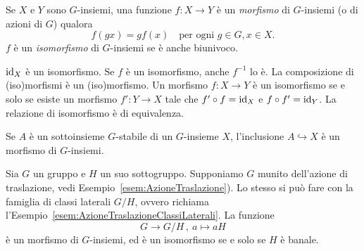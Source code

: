 



\begin{defi}
Se $X$ e $Y$ sono $G$-insiemi, una funzione $f : X\to Y$ è un {\em morfismo} di $G$-insiemi (o di azioni di $G$) qualora 
\[ f(gx) = gf(x) \quad\text{per ogni } g \in G, x \in X .\]
$f$ è un {\em isomorfismo} di $G$-insiemi se è anche biunivoco.
\end{defi}

\begin{osse}
$\mathrm{id}_X$ è un isomorfismo. Se $f$ è un isomorfismo, anche $f^{-1}$ lo è. La composizione di (iso)morfismi è un (iso)morfismo. Un morfismo $f : X\to Y$ è un isomorfismo se e solo se esiste un morfismo $f' : Y \to X$ tale che $f' \circ f = \mathrm{id}_X$ e $f \circ f' = \mathrm{id}_Y$. La relazione di isomorfismo è di equivalenza.
\end{osse}

\begin{esem}
Se $A$ è un sottoinsieme $G$-stabile di un $G$-insieme $X$, l'inclusione $A \hookrightarrow X$ è un morfismo di $G$-insiemi.
\end{esem}

\begin{esem}
Sia $G$ un gruppo e $H$ un suo sottogruppo. Supponiamo $G$ munito dell'azione di traslazione, vedi Esempio~\ref{esem:AzioneTraslazione}). Lo stesso si può fare con la famiglia di classi laterali $G/H$, ovvero richiama l'Esempio~\ref{esem:AzioneTraslazioneClassiLaterali}. La funzione 
\[G \to G/H \,,\ a \mapsto aH\]
è un morfismo di $G$-insiemi, ed è un isomorfismo se e solo se $H$ è banale.
\end{esem}
